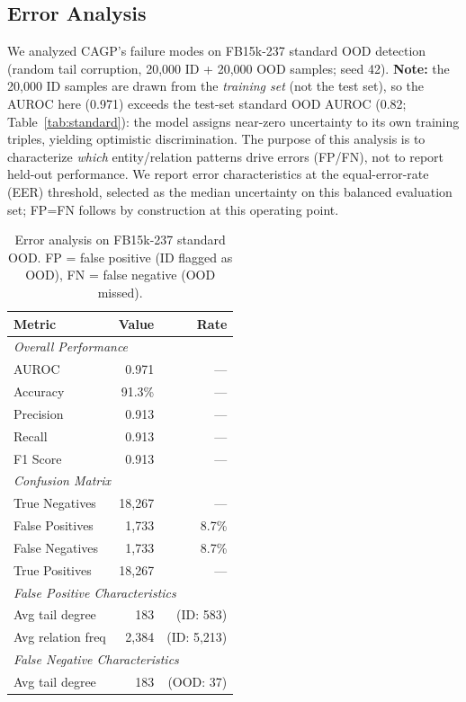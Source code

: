 \documentclass{article}
\begin{document}
\subsection{Error Analysis}
\label{app:error_analysis}

We analyzed CAGP's failure modes on FB15k-237 standard OOD detection (random tail corruption, 20,000 ID + 20,000 OOD samples; seed 42). \textbf{Note:} the 20,000 ID samples are drawn from the \emph{training set} (not the test set), so the AUROC here (0.971) exceeds the test-set standard OOD AUROC (0.82; Table~\ref{tab:standard}): the model assigns near-zero uncertainty to its own training triples, yielding optimistic discrimination. The purpose of this analysis is to characterize \emph{which} entity/relation patterns drive errors (FP/FN), not to report held-out performance. We report error characteristics at the equal-error-rate (EER) threshold, selected as the median uncertainty on this balanced evaluation set; FP=FN follows by construction at this operating point.

\begin{table}[ht]
\centering
\caption{Error analysis on FB15k-237 standard OOD. FP = false positive (ID flagged as OOD), FN = false negative (OOD missed).}
\label{tab:error_analysis}
\small
\begin{tabular}{lrr}
\toprule
Metric & Value & Rate \\
\midrule
\multicolumn{3}{l}{\textit{Overall Performance}} \\
AUROC & 0.971 & --- \\
Accuracy & 91.3\% & --- \\
Precision & 0.913 & --- \\
Recall & 0.913 & --- \\
F1 Score & 0.913 & --- \\
\midrule
\multicolumn{3}{l}{\textit{Confusion Matrix}} \\
True Negatives & 18,267 & --- \\
False Positives & 1,733 & 8.7\% \\
False Negatives & 1,733 & 8.7\% \\
True Positives & 18,267 & --- \\
\midrule
\multicolumn{3}{l}{\textit{False Positive Characteristics}} \\
Avg tail degree & 183 & (ID: 583) \\
Avg relation freq & 2,384 & (ID: 5,213) \\
\midrule
\multicolumn{3}{l}{\textit{False Negative Characteristics}} \\
Avg tail degree & 183 & (OOD: 37) \\
\bottomrule
\end{tabular}
\end{table}
\end{document}
